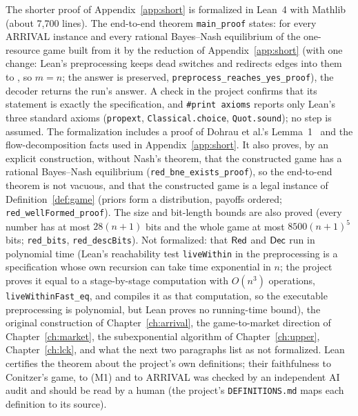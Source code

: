The shorter proof of Appendix~\ref{app:short} is formalized in Lean~4 with Mathlib (about 7{,}700 lines).
The end-to-end theorem \texttt{main\_proof} states: for every ARRIVAL instance and every rational
Bayes--Nash equilibrium of the one-resource game built from it by the reduction of Appendix~\ref{app:short} (with one change: Lean's preprocessing keeps dead switches and redirects edges into them to \no{}, so $m=n$; the answer is preserved, \texttt{preprocess\_reaches\_yes\_proof}), the decoder returns the run's answer. A check in the project confirms that its
statement is exactly the specification, and \texttt{\#print axioms} reports only Lean's three standard
axioms (\texttt{propext}, \texttt{Classical.choice}, \texttt{Quot.sound}); no step is assumed. The
formalization includes a proof of Dohrau et al.'s Lemma~1~\cite{dgkmw17} and the flow-decomposition
facts used in Appendix~\ref{app:short}. It also proves, by an explicit construction, without Nash's theorem, that the constructed game has a rational Bayes--Nash equilibrium (\texttt{red\_bne\_exists\_proof}), so the end-to-end theorem is not vacuous, and that the constructed game is a legal instance of Definition~\ref{def:game} (priors form a distribution, payoffs ordered; \texttt{red\_wellFormed\_proof}). The size and bit-length bounds are also proved (every number has at most $28(n+1)$ bits and the whole game at most $8500(n+1)^5$ bits; \texttt{red\_bits}, \texttt{red\_descBits}). Not formalized: that $\mathsf{Red}$ and $\mathsf{Dec}$ run in polynomial time (Lean's reachability test \texttt{liveWithin} in the preprocessing is a specification whose own recursion can take time exponential in $n$; the project proves it equal to a stage-by-stage computation with $O(n^3)$ operations, \texttt{liveWithinFast\_eq}, and compiles it as that computation, so the executable preprocessing is polynomial, but Lean proves no running-time bound), the original construction of
Chapter~\ref{ch:arrival}, the game-to-market direction of Chapter~\ref{ch:market}, the subexponential algorithm of Chapter~\ref{ch:upper}, Chapter~\ref{ch:lck}, and what the next two paragraphs list as not formalized.
Lean certifies the theorem about the project's own definitions; their faithfulness to Conitzer's game,
to (M1) and to ARRIVAL was checked by an independent AI audit and should be read by a human
(the project's \texttt{DEFINITIONS.md} maps each definition to its source).

